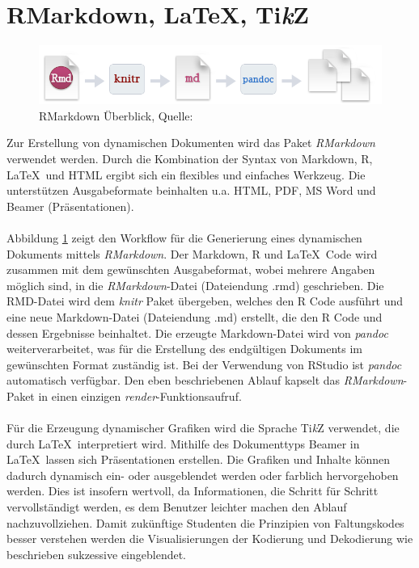 \section{RMarkdown, \LaTeX, Ti\textit{k}Z}
\label{kapitel:rmarkdown}
\begin{figure}[!t]
\centering
\includegraphics[width=\textwidth]{abbildungen/rmarkdown}
\caption{RMarkdown Überblick, Quelle: \cite{rmarkdown}}
\label{abb:rmarkdown}
\end{figure}
Zur Erstellung von dynamischen Dokumenten wird das Paket \emph{RMarkdown} verwendet werden. Durch die Kombination der Syntax von Markdown, R, \LaTeX\ und HTML ergibt sich ein flexibles und einfaches Werkzeug. Die unterstützen Ausgabeformate beinhalten u.a. HTML, PDF, MS Word und Beamer (Präsentationen).
\\
\\
Abbildung \ref{abb:rmarkdown} zeigt den Workflow für die Generierung eines dynamischen Dokuments mittels \emph{RMarkdown}. Der Markdown, R und \LaTeX\ Code wird zusammen mit dem gewünschten Ausgabeformat, wobei mehrere Angaben möglich sind, in die \emph{RMarkdown}-Datei (Dateiendung .rmd) geschrieben. Die RMD-Datei wird dem \emph{knitr} Paket übergeben, welches den R Code ausführt und eine neue Markdown-Datei (Dateiendung .md) erstellt, die den R Code und dessen Ergebnisse beinhaltet. Die erzeugte Markdown-Datei wird von \emph{pandoc} weiterverarbeitet, was für die Erstellung des endgültigen Dokuments im gewünschten Format zuständig ist. Bei der Verwendung von RStudio ist \emph{pandoc} automatisch verfügbar. Den eben beschriebenen Ablauf kapselt das \emph{RMarkdown}-Paket in einen einzigen \emph{render}-Funktionsaufruf.
\\
\\
Für die Erzeugung dynamischer Grafiken wird die Sprache Ti\textit{k}Z verwendet, die durch \LaTeX\ interpretiert wird. Mithilfe des Dokumenttyps Beamer in \LaTeX\ lassen sich Präsentationen erstellen. Die Grafiken und Inhalte können dadurch dynamisch ein- oder ausgeblendet werden oder farblich hervorgehoben werden. Dies ist insofern wertvoll, da Informationen, die Schritt für Schritt vervollständigt werden, es dem Benutzer leichter machen den Ablauf nachzuvollziehen. Damit zukünftige Studenten die Prinzipien von Faltungskodes besser verstehen werden die Visualisierungen der Kodierung und Dekodierung wie beschrieben sukzessive eingeblendet.